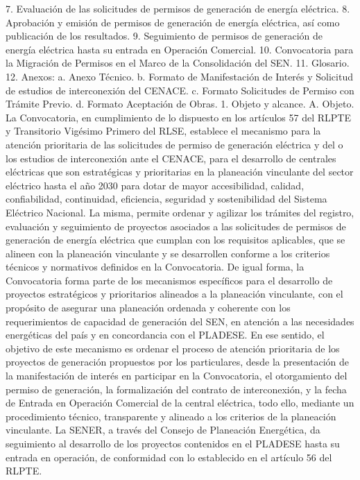 7.	Evaluación de las solicitudes de permisos de generación de energía eléctrica.
8.	Aprobación y emisión de permisos de generación de energía eléctrica, así como publicación de los resultados.
9.	Seguimiento de permisos de generación de energía eléctrica hasta su entrada en Operación Comercial.
10.	Convocatoria para la Migración de Permisos en el Marco de la Consolidación del SEN.
11.	Glosario.
12.	Anexos:
a.	Anexo Técnico.
b.	Formato de Manifestación de Interés y Solicitud de estudios de interconexión del CENACE.
c.	Formato Solicitudes de Permiso con Trámite Previo.
d.	Formato Aceptación de Obras.
1. Objeto y alcance.
A. Objeto.
La Convocatoria, en cumplimiento de lo dispuesto en los artículos 57 del RLPTE y Transitorio Vigésimo Primero del RLSE, establece el mecanismo para la atención prioritaria de las solicitudes de permiso de generación eléctrica y del o los estudios de interconexión ante el CENACE, para el desarrollo de centrales eléctricas que son estratégicas y prioritarias en la planeación vinculante del sector eléctrico hasta el año 2030 para dotar de mayor accesibilidad, calidad, confiabilidad, continuidad, eficiencia, seguridad y sostenibilidad del Sistema Eléctrico Nacional. La misma, permite ordenar y agilizar los trámites del registro, evaluación y seguimiento de proyectos asociados a las solicitudes de permisos de generación de energía eléctrica que cumplan con los requisitos aplicables, que se alineen con la planeación vinculante y se desarrollen conforme a los criterios técnicos y normativos definidos en la Convocatoria.
De igual forma, la Convocatoria forma parte de los mecanismos específicos para el desarrollo de proyectos estratégicos y prioritarios alineados a la planeación vinculante, con el propósito de asegurar una planeación ordenada y coherente con los requerimientos de capacidad de generación del SEN, en atención a las necesidades energéticas del país y en concordancia con el PLADESE.
En ese sentido, el objetivo de este mecanismo es ordenar el proceso de atención prioritaria de los proyectos de generación propuestos por los particulares, desde la presentación de la manifestación de interés en participar en la Convocatoria, el otorgamiento del permiso de generación, la formalización del contrato de interconexión, y la fecha de Entrada en Operación Comercial de la central eléctrica, todo ello, mediante un procedimiento técnico, transparente y alineado a los criterios de la planeación vinculante.
La SENER, a través del Consejo de Planeación Energética, da seguimiento al desarrollo de los proyectos contenidos en el PLADESE hasta su entrada en operación, de conformidad con lo establecido en el artículo 56 del RLPTE.
